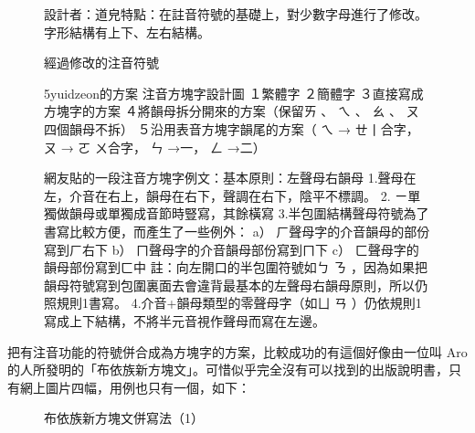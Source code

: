 \documentclass[a5paper, 12pt, openany]{book} %
\begin{document}
\begin{figure}[H]
\centering
\caption{設計者：道皃特點：在註音符號的基礎上，對少數字母進行了修改。字形結構有上下、左右結構。}
\label{fig:zhuyin_composed_2}
\end{figure}

\begin{figure}[H]
\centering
\caption{經過修改的注音符號}
\label{fig:zhuyin_composed_3}
\end{figure}


\begin{figure}[H]
\centering
\caption{5yuidzeon的方案 注音方塊字設計圖 １繁體字 ２簡體字 ３直接寫成方塊字的方案 ４將韻母拆分開來的方案（保留ㄞ 、 ㄟ 、 ㄠ 、 ㄡ四個韻母不拆） ５沿用表音方塊字韻尾的方案（ ㄟ → ㄝ丨合字， ㄡ → ㄛ ㄨ合字， ㄣ →一， ㄥ →二）}
\label{fig:zhuyin_composed_4}
\end{figure}


\begin{figure}[H]
\centering
\caption{網友貼的一段注音方塊字例文：基本原則：左聲母右韻母 1.聲母在左，介音在右上，韻母在右下，聲調在右下，陰平不標調。 2. ㄧ單獨做韻母或單獨成音節時豎寫，其餘橫寫 3.半包圍結構聲母符號為了書寫比較方便，而產生了一些例外： a） ㄏ聲母字的介音韻母的部份寫到ㄏ右下 b） ㄇ聲母字的介音韻母部份寫到ㄇ下 c） ㄈ聲母字的韻母部份寫到ㄈ中 註：向左開口的半包圍符號如ㄅ ㄋ ，因為如果把韻母符號寫到包圍裏面去會違背最基本的左聲母右韻母原則，所以仍照規則1書寫。 4.介音+韻母類型的零聲母字（如ㄩ ㄢ ）仍依規則1寫成上下結構，不將半元音視作聲母而寫在左邊。}
\end{figure}


把有注音功能的符號併合成為方塊字的方案，比較成功的有這個好像由一位叫 Aro 的人所發明的「布依族新方塊文」。可惜似乎完全沒有可以找到的出版說明書，只有網上圖片四幅，用例也只有一個，如下：

  \begin{figure}[H]
\centering
\end{figure}

  \begin{figure}[H]
\centering
\caption{布依族新方塊文併寫法（1）}
\end{figure}
\end{document}
